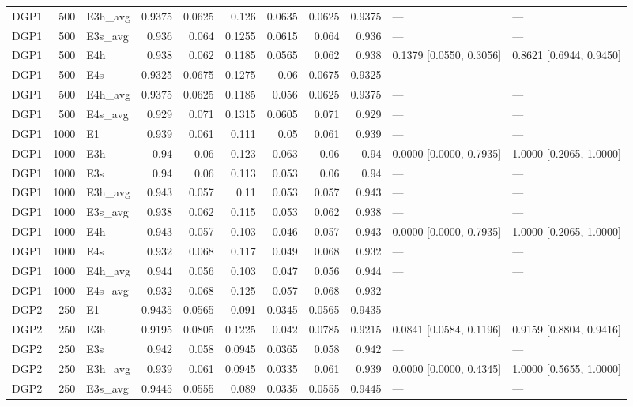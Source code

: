 \begin{scriptsize}
\begin{longtable}{lrlrrrrrrll}
DGP1 & 500 & E3h_avg & 0.9375 & 0.0625 & 0.126 & 0.0635 & 0.0625 & 0.9375 & --- & --- \\
DGP1 & 500 & E3s_avg & 0.936 & 0.064 & 0.1255 & 0.0615 & 0.064 & 0.936 & --- & --- \\
DGP1 & 500 & E4h & 0.938 & 0.062 & 0.1185 & 0.0565 & 0.062 & 0.938 & 0.1379 [0.0550, 0.3056] & 0.8621 [0.6944, 0.9450] \\
DGP1 & 500 & E4s & 0.9325 & 0.0675 & 0.1275 & 0.06 & 0.0675 & 0.9325 & --- & --- \\
DGP1 & 500 & E4h_avg & 0.9375 & 0.0625 & 0.1185 & 0.056 & 0.0625 & 0.9375 & --- & --- \\
DGP1 & 500 & E4s_avg & 0.929 & 0.071 & 0.1315 & 0.0605 & 0.071 & 0.929 & --- & --- \\
DGP1 & 1000 & E1 & 0.939 & 0.061 & 0.111 & 0.05 & 0.061 & 0.939 & --- & --- \\
DGP1 & 1000 & E3h & 0.94 & 0.06 & 0.123 & 0.063 & 0.06 & 0.94 & 0.0000 [0.0000, 0.7935] & 1.0000 [0.2065, 1.0000] \\
DGP1 & 1000 & E3s & 0.94 & 0.06 & 0.113 & 0.053 & 0.06 & 0.94 & --- & --- \\
DGP1 & 1000 & E3h_avg & 0.943 & 0.057 & 0.11 & 0.053 & 0.057 & 0.943 & --- & --- \\
DGP1 & 1000 & E3s_avg & 0.938 & 0.062 & 0.115 & 0.053 & 0.062 & 0.938 & --- & --- \\
DGP1 & 1000 & E4h & 0.943 & 0.057 & 0.103 & 0.046 & 0.057 & 0.943 & 0.0000 [0.0000, 0.7935] & 1.0000 [0.2065, 1.0000] \\
DGP1 & 1000 & E4s & 0.932 & 0.068 & 0.117 & 0.049 & 0.068 & 0.932 & --- & --- \\
DGP1 & 1000 & E4h_avg & 0.944 & 0.056 & 0.103 & 0.047 & 0.056 & 0.944 & --- & --- \\
DGP1 & 1000 & E4s_avg & 0.932 & 0.068 & 0.125 & 0.057 & 0.068 & 0.932 & --- & --- \\
DGP2 & 250 & E1 & 0.9435 & 0.0565 & 0.091 & 0.0345 & 0.0565 & 0.9435 & --- & --- \\
DGP2 & 250 & E3h & 0.9195 & 0.0805 & 0.1225 & 0.042 & 0.0785 & 0.9215 & 0.0841 [0.0584, 0.1196] & 0.9159 [0.8804, 0.9416] \\
DGP2 & 250 & E3s & 0.942 & 0.058 & 0.0945 & 0.0365 & 0.058 & 0.942 & --- & --- \\
DGP2 & 250 & E3h_avg & 0.939 & 0.061 & 0.0945 & 0.0335 & 0.061 & 0.939 & 0.0000 [0.0000, 0.4345] & 1.0000 [0.5655, 1.0000] \\
DGP2 & 250 & E3s_avg & 0.9445 & 0.0555 & 0.089 & 0.0335 & 0.0555 & 0.9445 & --- & --- \\

\end{longtable}
\end{scriptsize}
